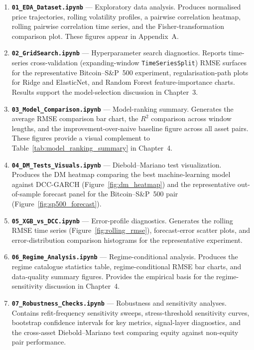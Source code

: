 \begin{enumerate}
    \item \textbf{\texttt{01\_EDA\_Dataset.ipynb}} --- Exploratory data analysis. Produces normalised price trajectories, rolling volatility profiles, a pairwise correlation heatmap, rolling pairwise correlation time series, and the Fisher-transformation comparison plot. These figures appear in Appendix~A.

    \item \textbf{\texttt{02\_GridSearch.ipynb}} --- Hyperparameter search diagnostics. Reports time-series cross-validation (expanding-window \texttt{TimeSeriesSplit}) RMSE surfaces for the representative Bitcoin--S\&P~500 experiment, regularisation-path plots for Ridge and ElasticNet, and Random Forest feature-importance charts. Results support the model-selection discussion in Chapter~3.

    \item \textbf{\texttt{03\_Model\_Comparison.ipynb}} --- Model-ranking summary. Generates the average RMSE comparison bar chart, the $R^2$ comparison across window lengths, and the improvement-over-naive baseline figure across all asset pairs. These figures provide a visual complement to Table~\ref{tab:model_ranking_summary} in Chapter~4.

    \item \textbf{\texttt{04\_DM\_Tests\_Visuals.ipynb}} --- Diebold--Mariano test visualization. Produces the DM heatmap comparing the best machine-learning model against DCC-GARCH (Figure~\ref{fig:dm_heatmap}) and the representative out-of-sample forecast panel for the Bitcoin--S\&P~500 pair (Figure~\ref{fig:sp500_forecast}).

    \item \textbf{\texttt{05\_XGB\_vs\_DCC.ipynb}} --- Error-profile diagnostics. Generates the rolling RMSE time series (Figure~\ref{fig:rolling_rmse}), forecast-error scatter plots, and error-distribution comparison histograms for the representative experiment.

    \item \textbf{\texttt{06\_Regime\_Analysis.ipynb}} --- Regime-conditional analysis. Produces the regime catalogue statistics table, regime-conditional RMSE bar charts, and data-quality summary figures. Provides the empirical basis for the regime-sensitivity discussion in Chapter~4.

    \item \textbf{\texttt{07\_Robustness\_Checks.ipynb}} --- Robustness and sensitivity analyses. Contains refit-frequency sensitivity sweeps, stress-threshold sensitivity curves, bootstrap confidence intervals for key metrics, signal-layer diagnostics, and the cross-asset Diebold--Mariano test comparing equity against non-equity pair performance.


\end{enumerate}
